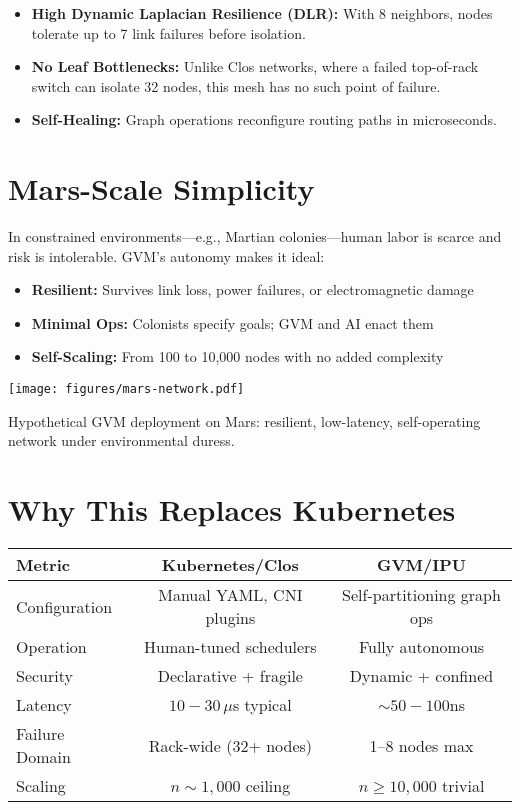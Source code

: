 \begin{itemize}
  \item \textbf{High Dynamic Laplacian Resilience (DLR):} With 8 neighbors, nodes tolerate up to 7 link failures before isolation.
  \item \textbf{No Leaf Bottlenecks:} Unlike Clos networks, where a failed top-of-rack switch can isolate 32 nodes, this mesh has no such point of failure.
  \item \textbf{Self-Healing:} Graph operations reconfigure routing paths in microseconds.
\end{itemize}

\section{Mars-Scale Simplicity}

In constrained environments—e.g., Martian colonies—human labor is scarce and risk is intolerable. GVM’s autonomy makes it ideal:

\begin{itemize}
  \item \textbf{Resilient:} Survives link loss, power failures, or electromagnetic damage
  \item \textbf{Minimal Ops:} Colonists specify goals; GVM and AI enact them
  \item \textbf{Self-Scaling:} From 100 to 10,000 nodes with no added complexity
\end{itemize}

\begin{marginfigure}
  \texttt{[image: figures/mars-network.pdf]}
  \caption{Hypothetical GVM deployment on Mars: resilient, low-latency, self-operating network under environmental duress.}
\end{marginfigure}

\section{Why This Replaces Kubernetes}

\begin{center}
\begin{tabular}{lcc}
\toprule
\textbf{Metric} & \textbf{Kubernetes/Clos} & \textbf{GVM/IPU} \\
\midrule
Configuration   & Manual YAML, CNI plugins & Self-partitioning graph ops \\
Operation       & Human-tuned schedulers   & Fully autonomous \\
Security        & Declarative + fragile    & Dynamic + confined \\
Latency         & $10{-}30\,\mu$s typical  & $\sim 50{-}100$ns \\
Failure Domain  & Rack-wide (32+ nodes)    & 1–8 nodes max \\
Scaling         & $n \sim 1,000$ ceiling   & $n \geq 10,000$ trivial \\
\bottomrule
\end{tabular}
\end{center}
